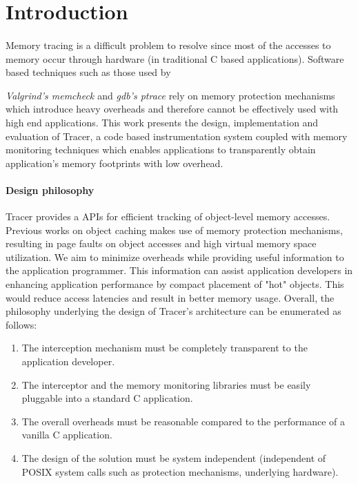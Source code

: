\section{Introduction} 
\label{sec:intro}
\paragraph{}
Memory tracing is a difficult problem to resolve since most of the accesses to memory occur through hardware (in traditional C based applications). Software based techniques such as those used by {\emph{Valgrind's memcheck \cite{nethercote2007valgrind}} and {\emph{gdb's ptrace}} \cite{gdb} rely on memory protection mechanisms which introduce heavy overheads and therefore cannot be effectively used with high end applications. This work presents the design, implementation and evaluation of Tracer, a code based instrumentation system coupled with memory monitoring techniques which enables applications to transparently obtain application's memory footprints with low overhead. 

\paragraph{Design philosophy}
Tracer provides a APIs for efficient tracking of object-level memory accesses. Previous works on object caching makes use of memory protection mechanisms, resulting in page faults on object accesses and high virtual memory space utilization. We aim to minimize overheads while providing useful information to the application programmer. This information can assist application developers in enhancing application performance by compact placement of "hot" objects. This would reduce access latencies and result in better memory usage. Overall, the philosophy underlying the design of Tracer's architecture can be enumerated as follows:
\begin{enumerate}
\item The interception mechanism must be completely transparent to the application developer.
\item The interceptor and the memory monitoring libraries must be easily pluggable into a standard C application.
\item The overall overheads must be reasonable compared to the performance of a vanilla C application.
\item The design of the solution must be system independent (independent of POSIX system calls such as protection mechanisms, underlying hardware).
\end{enumerate}

}
